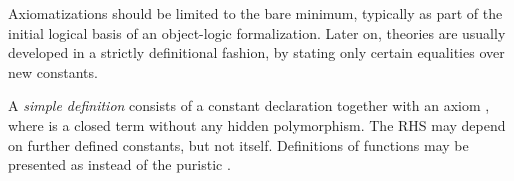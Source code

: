 \begin{isabellebody}
\begin{isamarkuptext}
  Axiomatizations should be limited to the bare minimum, typically as
  part of the initial logical basis of an object-logic formalization.
  Later on, theories are usually developed in a strictly definitional
  fashion, by stating only certain equalities over new constants.

  A \emph{simple definition} consists of a constant declaration  together with an axiom , where  is a closed term without any hidden polymorphism.  The RHS
  may depend on further defined constants, but not  itself.
  Definitions of functions may be presented as  instead of the puristic .


\end{isamarkuptext}
\end{isabellebody}
